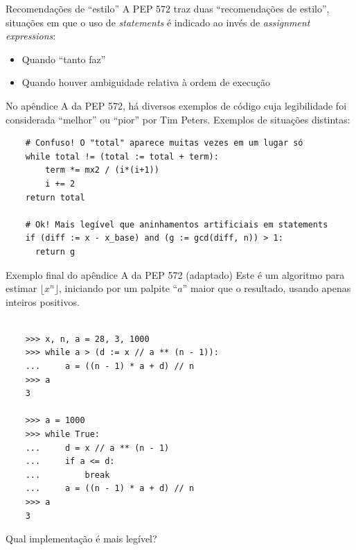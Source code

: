 \documentclass[utf8]{beamer}
\begin{document}
\begin{frame}[fragile]{Recomendações de ``estilo''}
  A PEP 572 traz duas ``recomendações de estilo'',
  situações em que o uso de \emph{statements}
  é indicado ao invés de \emph{assignment expressions}:
  \vfill
  \begin{itemize}
    \item Quando ``tanto faz''
    \item Quando houver ambiguidade relativa à ordem de execução
  \end{itemize}
  \vfill
  No apêndice A da PEP 572,
  há diversos exemplos de código
  cuja legibilidade foi considerada ``melhor'' ou ``pior''
  por Tim Peters.
  Exemplos de situações distintas:
  \begin{verbatim}
    # Confuso! O "total" aparece muitas vezes em um lugar só
    while total != (total := total + term):
        term *= mx2 / (i*(i+1))
        i += 2
    return total

    # Ok! Mais legível que aninhamentos artificiais em statements
    if (diff := x - x_base) and (g := gcd(diff, n)) > 1:
      return g
  \end{verbatim}
\end{frame}


\begin{frame}[fragile]{Exemplo final do apêndice A da PEP 572
                       (adaptado)}
  Este é um algoritmo para estimar $\lfloor x^n \rfloor$,
  iniciando por um palpite ``$a$'' maior que o resultado,
  usando apenas inteiros positivos.
  \vfill
  \begin{verbatim}

    >>> x, n, a = 28, 3, 1000
    >>> while a > (d := x // a ** (n - 1)):
    ...     a = ((n - 1) * a + d) // n
    >>> a
    3

    >>> a = 1000
    >>> while True:
    ...     d = x // a ** (n - 1)
    ...     if a <= d:
    ...         break
    ...     a = ((n - 1) * a + d) // n
    >>> a
    3

  \end{verbatim}
  \vfill
  Qual implementação é mais legível?
\end{frame}
\end{document}
